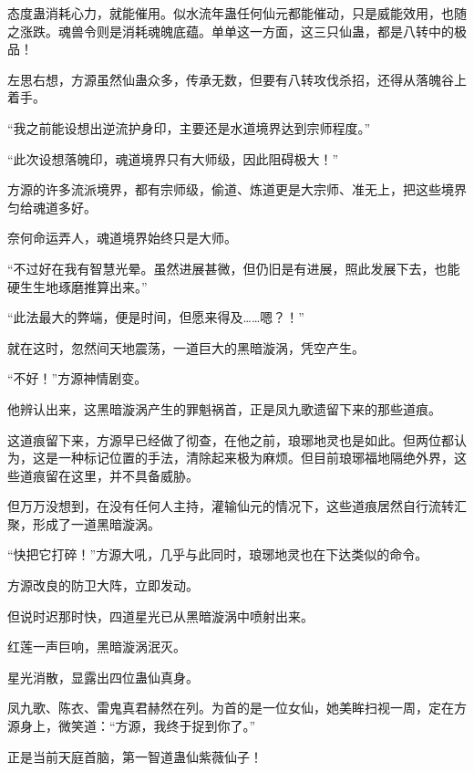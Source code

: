 \begin{this_body}
态度蛊消耗心力，就能催用。似水流年蛊任何仙元都能催动，只是威能效用，也随之涨跌。魂兽令则是消耗魂魄底蕴。单单这一方面，这三只仙蛊，都是八转中的极品！

左思右想，方源虽然仙蛊众多，传承无数，但要有八转攻伐杀招，还得从落魄谷上着手。

“我之前能设想出逆流护身印，主要还是水道境界达到宗师程度。”

“此次设想落魄印，魂道境界只有大师级，因此阻碍极大！”

方源的许多流派境界，都有宗师级，偷道、炼道更是大宗师、准无上，把这些境界匀给魂道多好。

奈何命运弄人，魂道境界始终只是大师。

“不过好在我有智慧光晕。虽然进展甚微，但仍旧是有进展，照此发展下去，也能硬生生地琢磨推算出来。”

“此法最大的弊端，便是时间，但愿来得及……嗯？！”

就在这时，忽然间天地震荡，一道巨大的黑暗漩涡，凭空产生。

“不好！”方源神情剧变。

他辨认出来，这黑暗漩涡产生的罪魁祸首，正是凤九歌遗留下来的那些道痕。

这道痕留下来，方源早已经做了彻查，在他之前，琅琊地灵也是如此。但两位都认为，这是一种标记位置的手法，清除起来极为麻烦。但目前琅琊福地隔绝外界，这些道痕留在这里，并不具备威胁。

但万万没想到，在没有任何人主持，灌输仙元的情况下，这些道痕居然自行流转汇聚，形成了一道黑暗漩涡。

“快把它打碎！”方源大吼，几乎与此同时，琅琊地灵也在下达类似的命令。

方源改良的防卫大阵，立即发动。

但说时迟那时快，四道星光已从黑暗漩涡中喷射出来。

红莲一声巨响，黑暗漩涡泯灭。

星光消散，显露出四位蛊仙真身。

凤九歌、陈衣、雷鬼真君赫然在列。为首的是一位女仙，她美眸扫视一周，定在方源身上，微笑道：“方源，我终于捉到你了。”

正是当前天庭首脑，第一智道蛊仙紫薇仙子！

\end{this_body}

